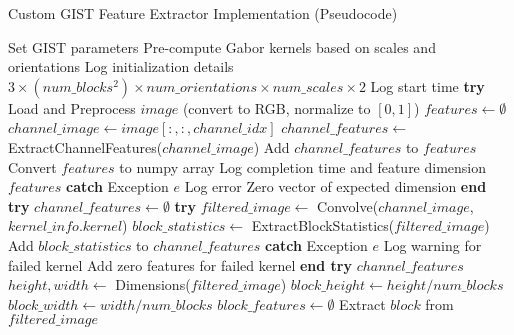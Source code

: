 \begin{algorithm}[!htbp]
\caption{Custom GIST Feature Extractor Implementation (Pseudocode)}
\label{alg:gist-implementation}
\begin{algorithmic}[1]
    \State Set GIST parameters
    \State Pre-compute Gabor kernels based on scales and orientations
    \State Log initialization details
\EndProcedure
\Statex
{}
    \Return $3 \times (num\_blocks^2) \times num\_orientations \times num\_scales \times 2$ 
\EndFunction
\Statex
{}
    \State Log start time
    \State \textbf{try}
        \State Load and Preprocess $image$ (convert to RGB, normalize to $[0,1]$)
        \State $features \leftarrow \emptyset$
            \State $channel\_image \leftarrow image[:, :, channel\_idx]$
            \State $channel\_features \leftarrow$ ExtractChannelFeatures($channel\_image$)
            \State Add $channel\_features$ to $features$
        \EndFor
        \State Convert $features$ to numpy array
        \State Log completion time and feature dimension
        \Return $features$
    \State \textbf{catch} {Exception $e$}
        \State Log error
        \Return Zero vector of expected dimension
    \State \textbf{end try}
\EndProcedure
\Statex
{}
    \State $channel\_features \leftarrow \emptyset$
        \State \textbf{try}
            \State $filtered\_image \leftarrow$ Convolve($channel\_image$, $kernel\_info.kernel$)
            \State $block\_statistics \leftarrow$ ExtractBlockStatistics($filtered\_image$)
            \State Add $block\_statistics$ to $channel\_features$
        \State \textbf{catch} {Exception $e$}
            \State Log warning for failed kernel
            \State Add zero features for failed kernel
        \State \textbf{end try}
    \EndFor
    \Return $channel\_features$
\EndProcedure
\Statex
{}
    \State $height, width \leftarrow$ Dimensions($filtered\_image$)
    \State $block\_height \leftarrow height / num\_blocks$
    \State $block\_width \leftarrow width / num\_blocks$
    \State $block\_features \leftarrow \emptyset$
            \State Extract $block$ from $filtered\_image$

\end{algorithmic}
\end{algorithm}

